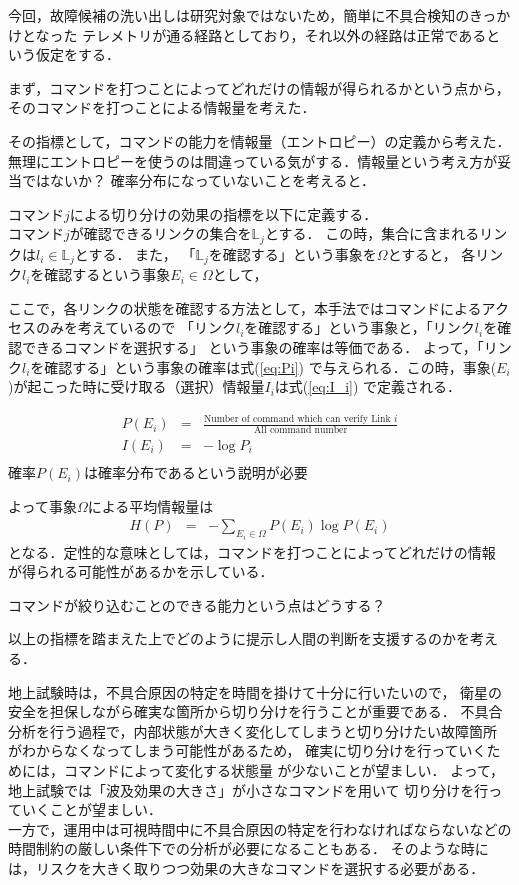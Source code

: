 \documentclass[11pt]{article}
\begin{document}
今回，故障候補の洗い出しは研究対象ではないため，簡単に不具合検知のきっかけとなった
テレメトリが通る経路としており，それ以外の経路は正常であるという仮定をする．


まず，コマンドを打つことによってどれだけの情報が得られるかという点から，
そのコマンドを打つことによる情報量を考えた．

その指標として，コマンドの能力を情報量（エントロピー）の定義から考えた．
無理にエントロピーを使うのは間違っている気がする．情報量という考え方が妥当ではないか？
確率分布になっていないことを考えると．

コマンド$j$による切り分けの効果の指標を以下に定義する．\\
コマンド$j$が確認できるリンクの集合を$\mathbb{L}_j$とする．
この時，集合に含まれるリンクは$l_i\in \mathbb{L}_j$とする．
また，
「$\mathbb{L}_j$を確認する」という事象を$\Omega$とすると，
各リンク$l_i$を確認するという事象$E_i \in \Omega$として，

ここで，各リンクの状態を確認する方法として，本手法ではコマンドによるアクセスのみを考えているので
「リンク$l_i$を確認する」という事象と，「リンク$l_i$を確認できるコマンドを選択する」
という事象の確率は等価である．%
よって，「リンク$l_i$を確認する」という事象の確率は式(\ref{eq:Pi})
で与えられる．この時，事象($E_i$)が起こった時に受け取る（選択）情報量$I_i$は式(\ref{eq:I_i})
で定義される．

\begin{eqnarray}
   P(E_i) &=& \frac{\text{Number of command which can verify Link }i}{\text{All command number}} \label{eq:Pi}\\
   I(E_i) &=& -\log{P_{i}} \label{eq:I_i} \\
\end{eqnarray}
確率$P(E_i)$は確率分布であるという説明が必要

よって事象$\Omega$による平均情報量は
\begin{eqnarray}
   H(P) &=& -\sum_{E_i \in \Omega} P(E_i)\log{P(E_i)} 
\end{eqnarray}
となる．定性的な意味としては，コマンドを打つことによってどれだけの情報
が得られる可能性があるかを示している．

コマンドが絞り込むことのできる能力という点はどうする？

以上の指標を踏まえた上でどのように提示し人間の判断を支援するのかを考える．

地上試験時は，不具合原因の特定を時間を掛けて十分に行いたいので，
衛星の安全を担保しながら確実な箇所から切り分けを行うことが重要である．
不具合分析を行う過程で，内部状態が大きく変化してしまうと切り分けたい故障箇所
がわからなくなってしまう可能性があるため，
確実に切り分けを行っていくためには，コマンドによって変化する状態量
が少ないことが望ましい．
よって，地上試験では「波及効果の大きさ」が小さなコマンドを用いて
切り分けを行っていくことが望ましい．\\
一方で，運用中は可視時間中に不具合原因の特定を行わなければならないなどの
時間制約の厳しい条件下での分析が必要になることもある．
そのような時には，リスクを大きく取りつつ効果の大きなコマンドを選択する必要がある．
\end{document}
